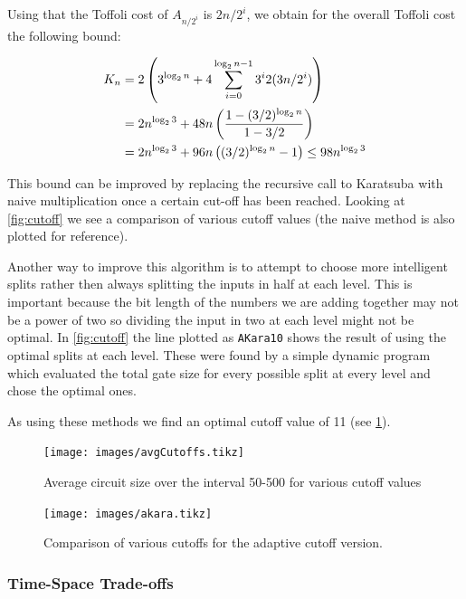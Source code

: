       Using that the Toffoli cost of $A_{n/2^i}$ is $2n/2^i$, we obtain for
      the overall Toffoli cost the following bound:

      \begin{align}
        K_n &= 2\left(3^{\log_2 n } + 4 \sum_{i=0}^{\log_2 n - 1} 3^i 2(3n/2^i)\right)\notag\\
            &= 2n^{\log_2 3} + 48n \left(\frac{1- (3/2)^{\log_2 n}}{1-3/2}\right) \notag\\
            &= 2n^{\log_2 3} + 96n \left((3/2)^{\log_2{n}} -1\right) \leq 98 n^{\log_2{3}}
      \end{align}

      This bound can be improved by replacing the recursive call to Karatsuba
      with naive multiplication once a certain cut-off has been reached.
      Looking at \cref{fig:cutoff} we see a comparison of various cutoff values
      (the naive method is also plotted for reference).

      Another way to improve this algorithm is to attempt to choose more
      intelligent splits rather then always splitting the inputs in half at
      each level.  This is important because the bit length of the numbers we
      are adding together may not be a power of two so dividing the input in
      two at each level might not be optimal.  In \cref{fig:cutoff} the line
      plotted as \verb+AKara10+ shows the result of using the optimal splits at
      each level.  These were found by a simple dynamic program which evaluated
      the total gate size for every possible split at every level and chose the
      optimal ones.

      As using these methods we find an optimal cutoff value of 11 (see
      \cref{fig:cutoffs}).

      \begin{figure}[p]
        \capstart
        \texttt{[image: images/avgCutoffs.tikz]}
        \caption{Average circuit size over the interval 50-500 for various cutoff values}
        \label{fig:cutoffs}
      \end{figure}
      \begin{figure}[p]
        \capstart
        \texttt{[image: images/akara.tikz]}
        \caption{Comparison of various cutoffs for the adaptive cutoff version.}
        \label{fig:aKara}
     \end{figure}

\subsubsection{Time-Space Trade-offs}

